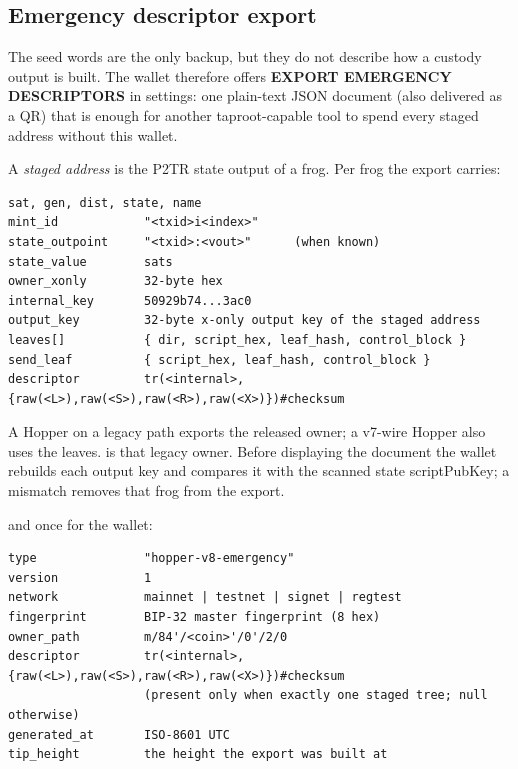 \subsection{Emergency descriptor export}

The seed words are the only backup, but they do not describe how a custody
output is built. The wallet therefore offers \textbf{EXPORT EMERGENCY
DESCRIPTORS} in settings: one plain-text JSON document (also delivered as a
QR) that is enough for another taproot-capable tool to spend every staged
address without this wallet.

A \emph{staged address} is the P2TR state output of a frog. Per frog the
export carries:
\begin{center}
\begin{minipage}{0.92\linewidth}
\begin{lstlisting}[language={},caption={Per-frog emergency export fields.},label={lst:emergency}]
sat, gen, dist, state, name
mint_id            "<txid>i<index>"
state_outpoint     "<txid>:<vout>"      (when known)
state_value        sats
owner_xonly        32-byte hex
internal_key       50929b74...3ac0
output_key         32-byte x-only output key of the staged address
leaves[]           { dir, script_hex, leaf_hash, control_block }
send_leaf          { script_hex, leaf_hash, control_block }
descriptor         tr(<internal>,{raw(<L>),raw(<S>),raw(<R>),raw(<X>)})#checksum
\end{lstlisting}
\end{minipage}
\end{center}
A Hopper on a legacy path exports the released owner; a v7-wire Hopper also
uses the  leaves.  is that legacy owner.
Before displaying the document the wallet rebuilds each output key and
compares it with the scanned state scriptPubKey; a mismatch removes that frog
from the export.

and once for the wallet:
\begin{center}
\begin{minipage}{0.92\linewidth}
\begin{lstlisting}[language={},caption={Wallet-level emergency export fields.},label={lst:emergency-wallet}]
type               "hopper-v8-emergency"
version            1
network            mainnet | testnet | signet | regtest
fingerprint        BIP-32 master fingerprint (8 hex)
owner_path         m/84'/<coin>'/0'/2/0
descriptor         tr(<internal>,{raw(<L>),raw(<S>),raw(<R>),raw(<X>)})#checksum
                   (present only when exactly one staged tree; null otherwise)
generated_at       ISO-8601 UTC
tip_height         the height the export was built at
\end{lstlisting}
\end{minipage}
\end{center}

